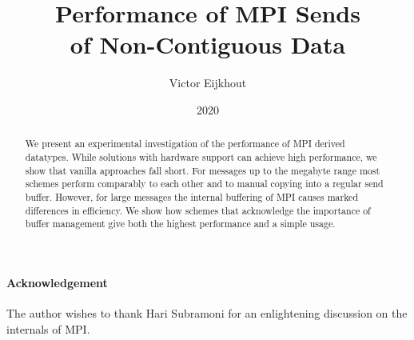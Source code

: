 \documentclass[conference]{IEEEtran}
\begin{document}
\title{Performance of MPI Sends\\ of Non-Contiguous Data}
\author{Victor Eijkhout}
\date{2020}
\maketitle

\begin{abstract}
  We present an experimental investigation of the performance of MPI
  derived datatypes. While solutions with hardware support can achieve
  high performance, we show that vanilla approaches fall short.
  For messages up to the megabyte range most
  schemes perform comparably to each other and to manual copying into
  a regular send buffer. However, for large messages the internal
  buffering of MPI causes marked differences in efficiency.
  We show how schemes that acknowledge the importance
  of buffer management
  give both the highest performance and a simple usage.
\end{abstract}



\paragraph*{\bf Acknowledgement} The author wishes to thank Hari
Subramoni for an enlightening discussion on the internals of MPI.

\newpage



\end{document}
